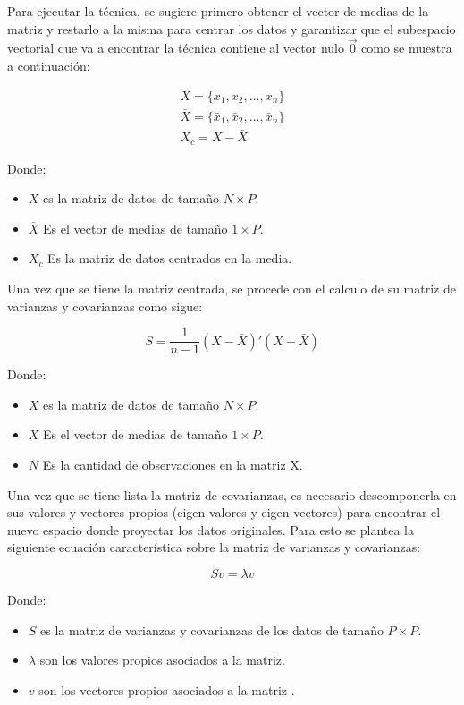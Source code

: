 \documentclass[11pt, letterpaper]{article}
\begin{document}
Para ejecutar la técnica, se sugiere primero obtener el vector de medias de la matriz y restarlo a la misma para centrar los datos y garantizar que el subespacio vectorial que va a encontrar la técnica contiene al vector nulo $\vec{0}$ como se muestra a continuación:

$$
\begin{matrix}
	X = \{x_1,x_2,\dots,x_n\} \\
	\bar{X} = \{\bar{x}_1,\bar{x}_2,\dots,\bar{x}_n\} \\
	X_c = X-\bar{X}
\end{matrix}
$$

Donde: 
\begin{itemize}
	\item $X$ es la matriz de datos de tamaño $N\times P$.
	\item $\bar{X}$ Es el vector de medias de tamaño $1\times P$.
	\item $X_c$ Es la matriz de datos centrados en la media.
\end{itemize}

Una vez que se tiene la matriz centrada, se procede con el calculo de su matriz de varianzas y covarianzas como sigue:

$$S = \frac{1}{n-1} (X-\bar{X})' (X-\bar{X})$$

Donde: 
\begin{itemize}
	\item $X$ es la matriz de datos de tamaño $N\times P$.
	\item $\bar{X}$ Es el vector de medias de tamaño $1\times P$.
	\item $N$ Es la cantidad de observaciones en la matriz X.
\end{itemize}

\newpage

Una vez que se tiene lista la matriz de covarianzas, es necesario descomponerla en sus valores y vectores propios (eigen valores y eigen vectores) para encontrar el nuevo espacio donde proyectar los datos originales. Para esto se plantea la siguiente ecuación característica sobre la matriz de varianzas y covarianzas:

$$Sv = \lambda v$$

Donde: 
\begin{itemize}
	\item $S$ es la matriz de varianzas y covarianzas de los datos de tamaño $P\times P$.
	\item $\lambda$ son los valores propios asociados a la matriz.
	\item $v$ son los vectores propios asociados a la matriz .
\end{itemize}
\end{document}
